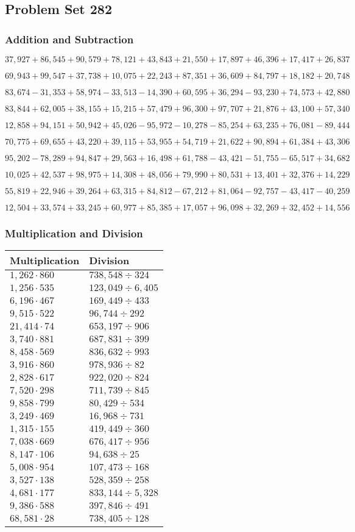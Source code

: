 \hypertarget{problem-set-282}{%
\subsection{Problem Set 282}\label{problem-set-282}}

\hypertarget{addition-and-subtraction}{%
\subsubsection{Addition and
Subtraction}\label{addition-and-subtraction}}

\(37,927+86,545+90,579+78,121+43,843+21,550+17,897+46,396+17,417+26,837\)

\(69,943+99,547+37,738+10,075+22,243+87,351+36,609+84,797+18,182+20,748\)

\(83,674-31,353+58,974-33,513-14,390+60,595+36,294-93,230+74,573+42,880\)

\(83,844+62,005+38,155+15,215+57,479+96,300+97,707+21,876+43,100+57,340\)

\(12,858+94,151+50,942+45,026-95,972-10,278-85,254+63,235+76,081-89,444\)

\(70,775+69,655+43,220+39,115+53,955+54,719+21,622+90,894+61,384+43,306\)

\(95,202-78,289+94,847+29,563+16,498+61,788-43,421-51,755-65,517+34,682\)

\(10,025+42,537+98,975+14,308+48,056+79,990+80,531+13,401+32,376+14,229\)

\(55,819+22,946+39,264+63,315+84,812-67,212+81,064-92,757-43,417-40,259\)

\(12,504+33,574+33,245+60,977+85,385+17,057+96,098+32,269+32,452+14,556\)

\hypertarget{multiplication-and-division}{%
\subsubsection{Multiplication and
Division}\label{multiplication-and-division}}

\begin{longtable}[]{@{}ll@{}}
\toprule
Multiplication & Division\tabularnewline
\midrule
\endhead
\(1,262\cdot860\) & \(738,548÷324\)\tabularnewline
\(1,256\cdot535\) & \(123,049÷6,405\)\tabularnewline
\(6,196\cdot467\) & \(169,449÷433\)\tabularnewline
\(9,515\cdot522\) & \(96,744÷292\)\tabularnewline
\(21,414\cdot74\) & \(653,197÷906\)\tabularnewline
\(3,740\cdot881\) & \(687,831÷399\)\tabularnewline
\(8,458\cdot569\) & \(836,632÷993\)\tabularnewline
\(3,916\cdot860\) & \(978,936÷82\)\tabularnewline
\(2,828\cdot617\) & \(922,020÷824\)\tabularnewline
\(7,520\cdot298\) & \(711,739÷845\)\tabularnewline
\(9,858\cdot799\) & \(80,429÷534\)\tabularnewline
\(3,249\cdot469\) & \(16,968÷731\)\tabularnewline
\(1,315\cdot155\) & \(419,449÷360\)\tabularnewline
\(7,038\cdot669\) & \(676,417÷956\)\tabularnewline
\(8,147\cdot106\) & \(94,638÷25\)\tabularnewline
\(5,008\cdot954\) & \(107,473÷168\)\tabularnewline
\(3,527\cdot138\) & \(528,359÷258\)\tabularnewline
\(4,681\cdot177\) & \(833,144÷5,328\)\tabularnewline
\(9,386\cdot588\) & \(397,846÷491\)\tabularnewline
\(68,581\cdot28\) & \(738,405÷128\)\tabularnewline
\bottomrule
\end{longtable}

